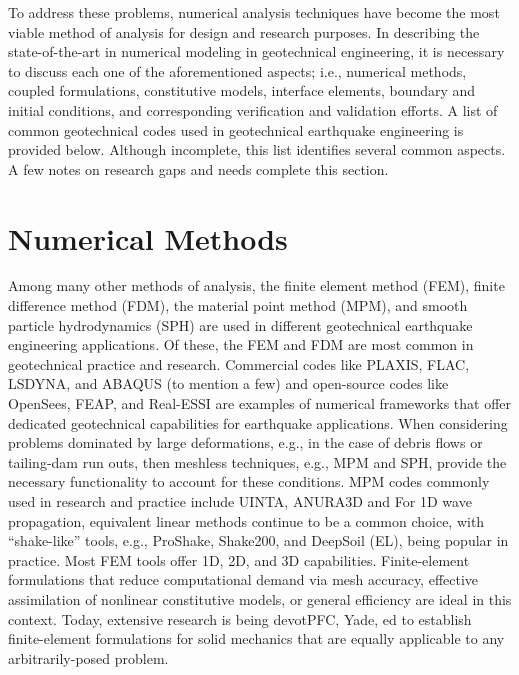 To address these problems, numerical analysis techniques have become the most viable method of analysis for design and research purposes. In describing the state-of-the-art in numerical modeling in geotechnical engineering, it is necessary to discuss each one of the aforementioned aspects; i.e., numerical methods, coupled formulations, constitutive models, interface elements, boundary and initial conditions, and corresponding verification and validation efforts. A list of common geotechnical codes used in geotechnical earthquake engineering is provided below. Although incomplete, this list identifies several common aspects. A few notes on research gaps and needs complete this section. 


\section{Numerical Methods}
\label{sec:resp_geotech_1}

Among many other methods of analysis, the finite element method (FEM), finite difference method (FDM), the material point method (MPM), and smooth particle hydrodynamics (SPH) are used in different geotechnical earthquake engineering applications. Of these, the FEM and FDM are most common in geotechnical practice and research. Commercial codes like PLAXIS, FLAC, LSDYNA, and ABAQUS (to mention a few) and open-source codes like OpenSees, FEAP, and Real-ESSI are examples of numerical frameworks that offer dedicated geotechnical capabilities for earthquake applications. When considering problems dominated by large deformations, e.g., in the case of debris flows or tailing-dam run outs, then meshless techniques, e.g., MPM and SPH, provide the necessary functionality to account for these conditions. MPM codes commonly used in research and practice include UINTA, ANURA3D and   For 1D wave propagation, equivalent linear methods continue to be a common choice, with “shake-like” tools, e.g., ProShake, Shake200, and DeepSoil (EL), being popular in practice. Most FEM tools offer 1D, 2D, and 3D capabilities. Finite-element formulations that reduce computational demand via mesh accuracy, eﬀective assimilation of nonlinear constitutive models, or general eﬃciency are ideal in this context. Today, extensive research is being devotPFC, Yade, ed to establish ﬁnite-element formulations for solid mechanics that are equally applicable to any arbitrarily-posed problem.

